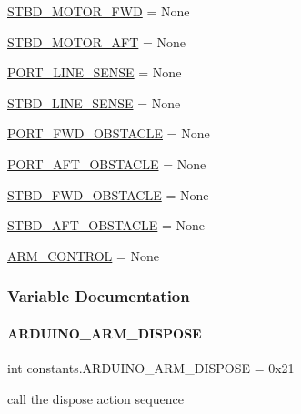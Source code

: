 \begin{DoxyCompactItemize}
\mbox{\hyperlink{namespaceconstants_a015f996840b301349187df888a10abb8}{S\+T\+B\+D\+\_\+\+M\+O\+T\+O\+R\+\_\+\+F\+WD}} = None
\item 
\mbox{\hyperlink{namespaceconstants_a68f8d12221a8313d05a7077d6d479ff2}{S\+T\+B\+D\+\_\+\+M\+O\+T\+O\+R\+\_\+\+A\+FT}} = None
\item 
\mbox{\hyperlink{namespaceconstants_aea01a0f4b9c84674449f3353981bbc44}{P\+O\+R\+T\+\_\+\+L\+I\+N\+E\+\_\+\+S\+E\+N\+SE}} = None
\item 
\mbox{\hyperlink{namespaceconstants_a88411761ddb3ee37b8ee8cd12aaa4274}{S\+T\+B\+D\+\_\+\+L\+I\+N\+E\+\_\+\+S\+E\+N\+SE}} = None
\item 
\mbox{\hyperlink{namespaceconstants_a2ca5dbee7bc812ac009f8e0850c81729}{P\+O\+R\+T\+\_\+\+F\+W\+D\+\_\+\+O\+B\+S\+T\+A\+C\+LE}} = None
\item 
\mbox{\hyperlink{namespaceconstants_ab6716eb9a3e511375036f0a4ee819fb3}{P\+O\+R\+T\+\_\+\+A\+F\+T\+\_\+\+O\+B\+S\+T\+A\+C\+LE}} = None
\item 
\mbox{\hyperlink{namespaceconstants_abf39bf2a606281dda2830fea9dc304bb}{S\+T\+B\+D\+\_\+\+F\+W\+D\+\_\+\+O\+B\+S\+T\+A\+C\+LE}} = None
\item 
\mbox{\hyperlink{namespaceconstants_a613ce37721b0e5bb55db40db4ef95b8a}{S\+T\+B\+D\+\_\+\+A\+F\+T\+\_\+\+O\+B\+S\+T\+A\+C\+LE}} = None
\item 
\mbox{\hyperlink{namespaceconstants_a6cd44c39def90b88882aeabde2c27957}{A\+R\+M\+\_\+\+C\+O\+N\+T\+R\+OL}} = None
\end{DoxyCompactItemize}


\subsubsection{Variable Documentation}
\mbox{\label{namespaceconstants_a868e5ebad4edc27cb1c6dc313cec7094}} 
\paragraph{\texorpdfstring{ARDUINO\_ARM\_DISPOSE}{ARDUINO\_ARM\_DISPOSE}}
{\footnotesize\ttfamily int constants.\+A\+R\+D\+U\+I\+N\+O\+\_\+\+A\+R\+M\+\_\+\+D\+I\+S\+P\+O\+SE = 0x21}



call the dispose action sequence 

